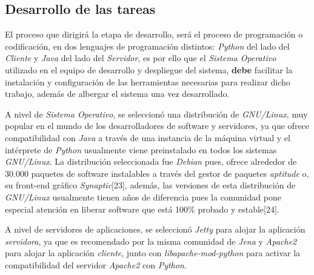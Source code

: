 \subsection{Desarrollo de las tareas}
El proceso que dirigirá la etapa de desarrollo, será el proceso de programación o codificación, en dos lenguajes de programación distintos: \textit{Python} del lado del \textit{Cliente} y \textit{Java} del lado del \textit{Servidor}, es por ello que el \textit{Sistema Operativo} utilizado en el equipo de desarrollo y despliegue del sistema, \textbf{debe} facilitar la instalación y configuración de las herramientas necesarias para realizar dicho trabajo, además de albergar el sistema una vez desarrollado.

A nivel de \textit{Sistema Operativo}, se seleccionó una distribución de \textit{GNU/Linux}, muy popular en el mundo de los desarrolladores de software y servidores, ya que ofrece compatibilidad con \textit{Java} a través de una instancia de la máquina virtual y el intérprete de \textit{Python} usualmente viene preinstalado en todos los sistemas \textit{GNU/Linux}. La distribución seleccionada fue \textit{Debian} pues, ofrece alrededor de 30.000 paquetes de software instalables a través del gestor de paquetes \textit{aptitude} o, su front-end gráfico \textit{Synaptic}[23], además, las versiones de esta distribución de \textit{GNU/Linux} usualmente tienen años de diferencia pues la comunidad pone especial atención en liberar software que está 100\% probado y estable[24].

A nivel de servidores de aplicaciones, se seleccionó \textit{Jetty} para alojar la aplicación \textit{servidora}, ya que es recomendado por la misma comunidad de \textit{Jena} y \textit{Apache2} para alojar la aplicación \textit{cliente}, junto con \textit{libapache-mod-python} para activar la compatibilidad del servidor \textit{Apache2} con \textit{Python}.

